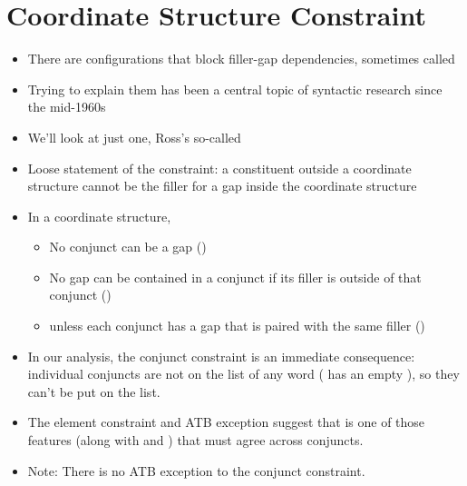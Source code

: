 \documentclass[a4paper,landscape,headrule,footrule]{foils}
\begin{document}
\section{Coordinate Structure Constraint}

\begin{itemize}
\item There are configurations that block filler-gap
dependencies, sometimes called 
\item Trying to explain them has been a central topic of
syntactic research since the mid-1960s
\item We'll look at just one, Ross's so-called
\item Loose statement of the constraint: a constituent
outside a coordinate structure cannot be the filler
for a gap inside the coordinate structure
\end{itemize}


\begin{exe}
  \ex {}
  \ex {}
  \ex {}
  \ex {}
  \ex {}
\end{exe}

\begin{itemize}
\item In a coordinate structure,
  \begin{itemize}
  \item No conjunct can be a gap ()
  \item No gap can be contained in a conjunct if its filler is
    outside of that conjunct ()
  \item[\ldots] unless each conjunct has a gap that is paired
with the same filler ()
\end{itemize}
\end{itemize}

\begin{itemize}
\item In our analysis, the conjunct constraint is an immediate
consequence: individual conjuncts are not on the  list
of any word ( has an empty ), so they can't be
put on the  list.
\item The element constraint and ATB exception suggest that 
is one of those features (along with  and ) that
must agree across conjuncts.
\item Note: There is no ATB exception to the conjunct constraint.
  \begin{exe}
    \ex {}
  \end{exe}
\end{itemize}
\end{document}
